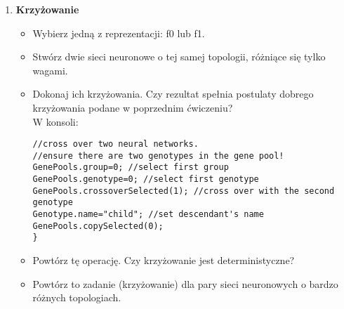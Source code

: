 \begin{enumerate}
\begin{itemize}
	\end{itemize}
\item \textbf{Krzyżowanie}
	\begin{itemize}
		\item Wybierz jedną z reprezentacji: f0 lub f1.
		\item Stwórz dwie sieci neuronowe o tej samej topologii, różniące się tylko wagami.
		\item Dokonaj ich krzyżowania. Czy rezultat spełnia postulaty dobrego krzyżowania podane w poprzednim ćwiczeniu? 
		\\W konsoli:
				\begin{verbatim}
//cross over two neural networks.
//ensure there are two genotypes in the gene pool! 
GenePools.group=0; //select first group
GenePools.genotype=0; //select first genotype
GenePools.crossoverSelected(1); //cross over with the second genotype
Genotype.name="child"; //set descendant's name
GenePools.copySelected(0);
}
		\end{verbatim}
		\item Powtórz tę operację. Czy krzyżowanie jest deterministyczne?
		\item Powtórz to zadanie (krzyżowanie) dla pary sieci neuronowych o bardzo różnych topologiach.
	\end{itemize}
\end{enumerate}
